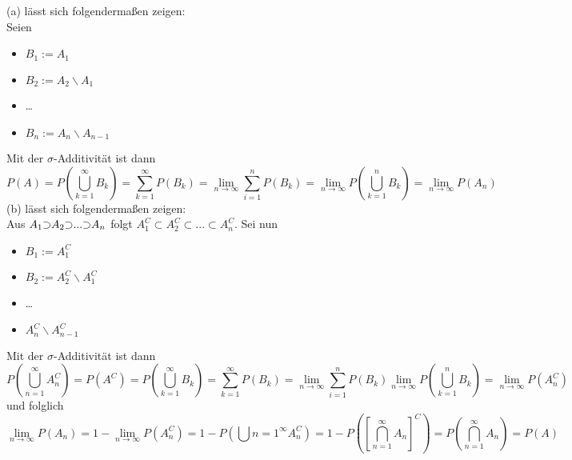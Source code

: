 \documentclass[a4paper,12pt]{article}
\begin{document}
(a) lässt sich folgendermaßen zeigen:\\
Seien
\begin{itemize}
	\item $B_1:= A_1$
	\item $B_2:= A_2 \backslash A_1$
	\item \dots
	\item $B_n:= A_n \backslash A_{n-1}$
\end{itemize}
Mit der $\sigma$-Additivität ist dann
$$
	P(A) = P \left( \bigcup_{k=1}^\infty B_k \right) = \sum_{k=1}^{\infty} P(B_k) = \lim_{n \to \infty} \sum_{i=1}^{n} P(B_k) = \lim_{n \to \infty} P \left( \bigcup_{k=1}^n B_k \right) = \lim_{n \to \infty} P(A_n)
$$
(b) lässt sich folgendermaßen zeigen:\\
Aus $ A_1 \reflectbox{$\subset$} A_2 \reflectbox{$\subset$} ... \reflectbox{$\subset$} A_n $ folgt $A_1^C \subset A_2^C \subset ... \subset A_n^C $. Sei nun
\begin{itemize}
	\item $B_1:= A_1^C$
	\item $B_2:= A_2^C \backslash A_1^C$
	\item \dots
	\item $A_n^C \backslash A_{n-1}^C$
\end{itemize}
Mit der $\sigma$-Additivität ist dann
$$
	P \left(\bigcup_{n=1}^\infty A_n^C\right) = P(A^C) = P \left( \bigcup_{k=1}^\infty B_k \right) = \sum_{k=1}^{\infty} P(B_k) = \lim_{n \to \infty} \sum_{i=1}^{n} P(B_k) \lim_{n \to \infty} P \left( \bigcup_{k=1}^n B_k \right) = \lim_{n \to \infty} P(A_n^C)
$$
und folglich
$$
	\lim_{n \to \infty}P(A_n) = 1 - \lim_{n \to \infty}P(A_n^C) = 1 - P \left( \bigcup{n=1}^\infty A_n^C \right) = 1 - P \left( \left[\bigcap_{n=1}^\infty A_n  \right]^C \right) = P \left(\bigcap_{n=1}^\infty A_n \right) = P(A)
$$
\end{document}

